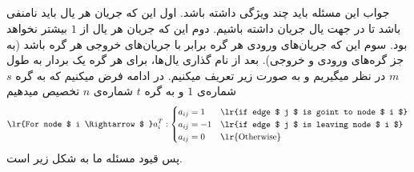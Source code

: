 \documentclass[a4paper]{article}
\begin{document}
\subsection{}
جواب این مسئله باید چند ویژگی داشته باشد. اول این که جریان هر یال باید نامنفی باشد تا در جهت یال جریان داشته باشیم. دوم این که جریان هر یال از $ 1 $ بیشتر نخواهد بود. سوم این که جریان‌های ورودی هر گره برابر با جریان‌های خروجی هر گره باشد (به جز گره‌های ورودی و خروجی). بعد از نام گذاری یال‌ها، برای هر گره یک بردار به طول $ m $ در نظر میگیریم و به صورت زیر تعریف میکنیم. در ادامه فرض میکنیم که به گره $ s $  شماره‌ی $ 1 $ و به گره $ t $ شماره‌ی $ n $ تخصیص میدهیم
\begin{equation*}
	\text{\lr{For node $ i \Rightarrow $ }} a_{i}^{T}: \begin{cases}
		a_{ij} = 1  & \text{\lr{if edge $ j $ is goint to node $ i $}} \\
		a_{ij} = -1 & \text{\lr{if edge $ j $ is leaving node $ i $}} \\
		a_{ij} = 0 & \text{\lr{Otherwise}} \\
	\end{cases} 
\end{equation*}
پس قیود مسئله ما به شکل زیر است.
\end{document}
